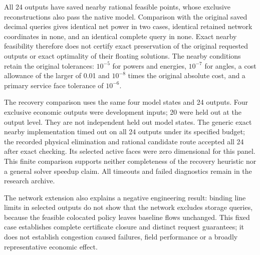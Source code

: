 All 24 outputs have saved nearby rational feasible points, whose exclusive
reconstructions also pass the native model. Comparison with the original
saved decimal queries gives identical net power in two cases, identical
retained network coordinates in none, and an identical complete query in
none. Exact nearby feasibility therefore does not certify exact preservation
of the original requested outputs or exact optimality of their floating
solutions. The nearby conditions retain the original tolerances: $10^{-5}$
for powers and energies, $10^{-7}$ for angles, a cost allowance of the larger
of 0.01 and $10^{-8}$ times the original absolute cost, and a primary service
face tolerance of $10^{-6}$.

The recovery comparison uses the same four model states and 24 outputs.
Four exclusive economic outputs were development inputs; 20 were held out
at the output level. They are not independent held out model states. The
generic exact nearby implementation timed out on all 24 outputs under its
specified budget; the recorded physical elimination and rational candidate
route accepted all 24 after exact checking. Its selected active faces were
zero dimensional for this panel. This finite comparison supports neither
completeness of the recovery heuristic nor a general solver speedup claim.
All timeouts and failed diagnostics remain in the research archive.

The network extension also explains a negative engineering result: binding
line limits in selected outputs do not show that the network excludes
storage queries, because the feasible colocated policy leaves baseline
flows unchanged. This fixed case establishes complete certificate closure
and distinct request guarantees; it does not establish congestion caused
failures, field performance or a broadly representative economic effect.
